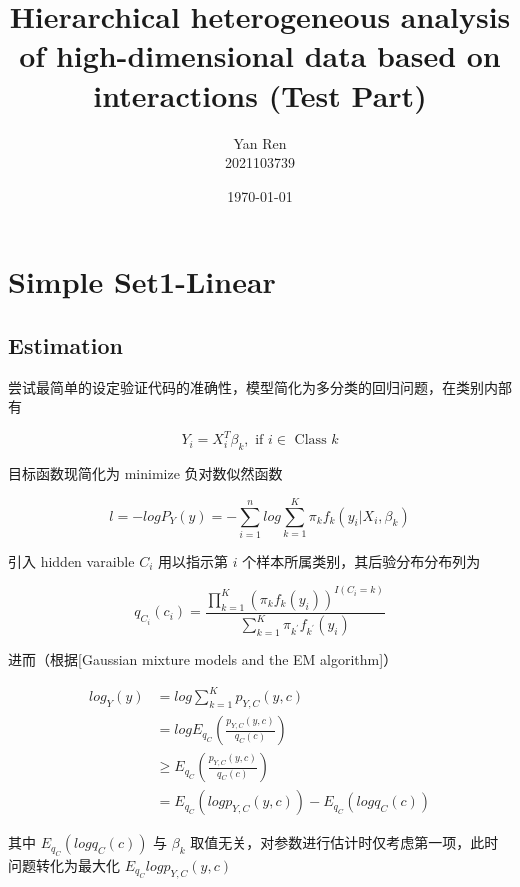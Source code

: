 \documentclass[12pt, a4paper, oneside]{article}
\title{\textbf{Hierarchical heterogeneous analysis of high-dimensional data
		based on interactions (Test Part)}}
\author{Yan Ren \\ 2021103739}
\date{\today}
\numberwithin{equation}{section}
\begin{document}
	
\maketitle
\newpage
\tableofcontents
\newpage

\section{Simple Set1-Linear}
\label{subsec:test-set1}

\subsection{Estimation}

尝试最简单的设定验证代码的准确性，模型简化为多分类的回归问题，在类别内部有

\begin{equation}
	Y_i = X_i^T \beta_k, \text{ if } i \in \text{ Class }k
\end{equation}

目标函数现简化为 minimize 负对数似然函数

\begin{equation}
	l = -log P_Y (y)  = -\sum_{i = 1}^{n} log\sum_{k=1}^K \pi_k f_k(y_i|X_i,\beta_k)
\end{equation}

引入 hidden varaible $C_i$ 用以指示第 $i$ 个样本所属类别，其后验分布分布列为

\begin{equation}
	q_{C_i}(c_i) = \frac{\displaystyle\prod_{k=1}^{K}{\left(\pi_k f_k(y_i)\right)^{I(C_i=k)}}}{\displaystyle\sum_{k=1}^{K}\pi_{k^\prime} f_{k^\prime}(y_i)}
\end{equation}

进而（根据[Gaussian mixture models and the EM algorithm]）

\begin{equation}
	\begin{aligned}
	log_Y (y)  &= log \sum_{k = 1}^{K}p_{Y,C}(y,c) \\
	&= log E_{q_C}\left(\frac{p_{Y,C}(y,c)}{q_C(c)}\right) \\
	&\geq E_{q_C}\left(\frac{p_{Y,C}(y,c)}{q_C(c)}\right) \\
	&= E_{q_C} \left(log p_{Y,C}(y,c)\right) - E_{q_C}\left(log q_C(c)\right)
	\end{aligned}
\end{equation}

其中 $E_{q_C}\left(log q_C(c)\right)$ 与 $\beta_k$ 取值无关，对参数进行估计时仅考虑第一项，此时问题转化为最大化 $E_{q_C} log p_{Y,C}(y,c)$
\end{document}
